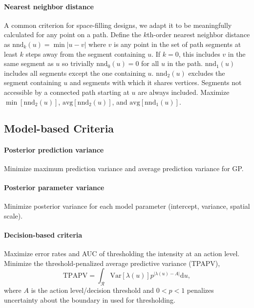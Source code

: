\documentclass[review]{elsarticle}
\begin{document}
\paragraph{Nearest neighbor distance}
A common criterion for space-filling designs, we adapt it to be meaningfully
calculated for any point on a path. Define the \(k\)th-order nearest neighbor
distance as \(\mathrm{nnd}_{k}(u) = \min|u - v|\) where \(v\) is any point
in the set of path segments at least \(k\) steps away from the segment
containing \(u\). If \(k = 0\), this includes \(v\) in the same segment as
\(u\) so trivially \(\mathrm{nnd}_{0}(u) = 0\) for all \(u\) in the path.
\(\mathrm{nnd}_{1}(u)\) includes all segments except the one containing \(u\).
\(\mathrm{nnd}_{2}(u)\) excludes the segment containing \(u\) and segments with
which it shares vertices. Segments not accessible by a connected path starting
at \(u\) are always included. Maximize \(\min[\mathrm{nnd}_{2}(u)]\),
\(\mathrm{avg}[\mathrm{nnd}_{2}(u)]\), and
\(\mathrm{avg}[\mathrm{nnd}_{1}(u)]\).


\subsection{Model-based Criteria}

\paragraph{Posterior prediction variance}
Minimize maximum prediction variance and average prediction variance for GP.

\paragraph{Posterior parameter variance}
Minimize posterior variance for each model parameter (intercept, variance,
spatial scale).

\paragraph{Decision-based criteria}
Maximize error rates and AUC of thresholding the intensity at an action level.
Minimize the threshold-penalized average predictive variance (TPAPV),
\begin{equation*}
\mathrm{TPAPV} = \int_{\mathcal{R}} \mathrm{Var}\left[\lambda(u)\right]
p^{\left|\lambda(u)-A\right|} \mathrm{d}u,
\end{equation*}
where \(A\) is the action level/decision threshold and \(0 < p < 1\) penalizes
uncertainty about the boundary in used for thresholding.
\end{document}
